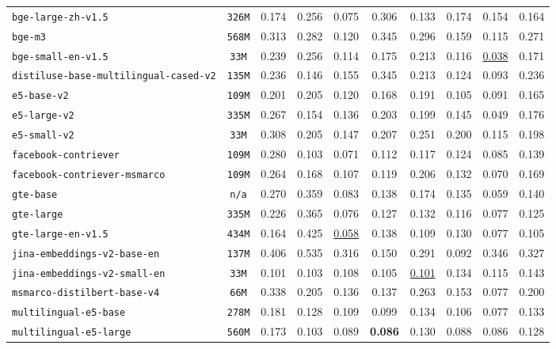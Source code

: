 \documentclass{article}
\begin{document}
\begin{table}[htbp]
{\begin{tabular}{lccccccccc}
\texttt{bge-large-zh-v1.5} & \texttt{326M} & 0.174 & 0.256 & 0.075 & 0.306 & 0.133 & 0.174 & 0.154 & 0.164 \\
\texttt{bge-m3} & \texttt{568M} & 0.313 & 0.282 & 0.120 & 0.345 & 0.296 & 0.159 & 0.115 & 0.271 \\
\texttt{bge-small-en-v1.5} & \texttt{33M} & 0.239 & 0.256 & 0.114 & 0.175 & 0.213 & 0.116 & \underline{0.038} & 0.171 \\
\texttt{distiluse-base-multilingual-cased-v2} & \texttt{135M} & 0.236 & 0.146 & 0.155 & 0.345 & 0.213 & 0.124 & 0.093 & 0.236 \\
\texttt{e5-base-v2} & \texttt{109M} & 0.201 & 0.205 & 0.120 & 0.168 & 0.191 & 0.105 & 0.091 & 0.165 \\
\texttt{e5-large-v2} & \texttt{335M} & 0.267 & 0.154 & 0.136 & 0.203 & 0.199 & 0.145 & 0.049 & 0.176 \\
\texttt{e5-small-v2} & \texttt{33M} & 0.308 & 0.205 & 0.147 & 0.207 & 0.251 & 0.200 & 0.115 & 0.198 \\
\texttt{facebook-contriever} & \texttt{109M} & 0.280 & 0.103 & 0.071 & 0.112 & 0.117 & 0.124 & 0.085 & 0.139 \\
\texttt{facebook-contriever-msmarco} & \texttt{109M} & 0.264 & 0.168 & 0.107 & 0.119 & 0.206 & 0.132 & 0.070 & 0.169 \\
\texttt{gte-base} & \texttt{n/a} & 0.270 & 0.359 & 0.083 & 0.138 & 0.174 & 0.135 & 0.059 & 0.140 \\
\texttt{gte-large} & \texttt{335M} & 0.226 & 0.365 & 0.076 & 0.127 & 0.132 & 0.116 & 0.077 & 0.125 \\
\texttt{gte-large-en-v1.5} & \texttt{434M} & 0.164 & 0.425 & \underline{0.058} & 0.138 & 0.109 & 0.130 & 0.077 & 0.105 \\
\texttt{jina-embeddings-v2-base-en} & \texttt{137M} & 0.406 & 0.535 & 0.316 & 0.150 & 0.291 & 0.092 & 0.346 & 0.327 \\
\texttt{jina-embeddings-v2-small-en} & \texttt{33M} & 0.101 & 0.103 & 0.108 & 0.105 & \underline{0.101} & 0.134 & 0.115 & 0.143 \\
\texttt{msmarco-distilbert-base-v4} & \texttt{66M} & 0.338 & 0.205 & 0.136 & 0.137 & 0.263 & 0.153 & 0.077 & 0.200 \\
\texttt{multilingual-e5-base} & \texttt{278M} & 0.181 & 0.128 & 0.109 & 0.099 & 0.134 & 0.106 & 0.077 & 0.133 \\
\texttt{multilingual-e5-large} & \texttt{560M} & 0.173 & 0.103 & 0.089 & \textbf{0.086} & 0.130 & 0.088 & 0.086 & 0.128 \\

\end{tabular}}
\end{table}
\end{document}
